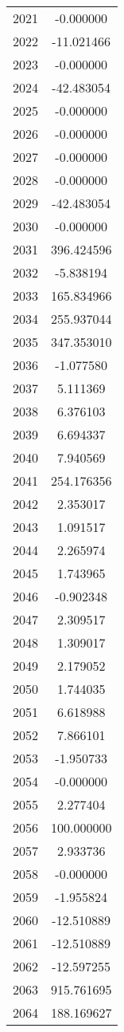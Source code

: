 \documentclass[12pt]{article}
\begin{document}
\begin{longtable}{@{}cc@{}}
2021 & -0.000000 \\
2022 & -11.021466 \\
2023 & -0.000000 \\
2024 & -42.483054 \\
2025 & -0.000000 \\
2026 & -0.000000 \\
2027 & -0.000000 \\
2028 & -0.000000 \\
2029 & -42.483054 \\
2030 & -0.000000 \\
2031 & 396.424596 \\
2032 & -5.838194 \\
2033 & 165.834966 \\
2034 & 255.937044 \\
2035 & 347.353010 \\
2036 & -1.077580 \\
2037 & 5.111369 \\
2038 & 6.376103 \\
2039 & 6.694337 \\
2040 & 7.940569 \\
2041 & 254.176356 \\
2042 & 2.353017 \\
2043 & 1.091517 \\
2044 & 2.265974 \\
2045 & 1.743965 \\
2046 & -0.902348 \\
2047 & 2.309517 \\
2048 & 1.309017 \\
2049 & 2.179052 \\
2050 & 1.744035 \\
2051 & 6.618988 \\
2052 & 7.866101 \\
2053 & -1.950733 \\
2054 & -0.000000 \\
2055 & 2.277404 \\
2056 & 100.000000 \\
2057 & 2.933736 \\
2058 & -0.000000 \\
2059 & -1.955824 \\
2060 & -12.510889 \\
2061 & -12.510889 \\
2062 & -12.597255 \\
2063 & 915.761695 \\
2064 & 188.169627 \\

\end{longtable}
\end{document}
